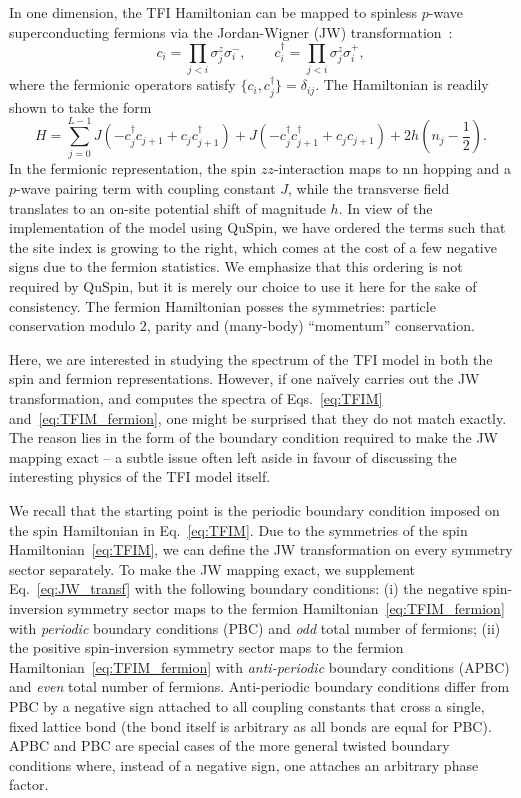 \documentclass{SciPost}
\newcommand\0{\scalebox{-1}[1]{0}}
\begin{document}
In one dimension, the TFI Hamiltonian can be mapped to spinless $p$-wave superconducting fermions via the Jordan-Wigner (JW) transformation~\cite{sachdev_book,dziarmaga_10,pfeuty_79}:
\begin{equation}
c_i=\prod_{j<i}\sigma^z_j\sigma^-_i,\qquad c^\dagger_i=\prod_{j<i}\sigma^z_j\sigma^+_i,
\label{eq:JW_transf}
\end{equation} 
where the fermionic operators satisfy $\{c_i,c^\dagger_j\}=\delta_{ij}$. The Hamiltonian is readily shown to take the form
\begin{equation}
H=\sum_{j=0}^{L-1}J\left(-c^\dagger_jc_{j+1} + c_jc^\dagger_{j+1} \right) +J\left( -c^\dagger_jc^\dagger_{j+1} + c_jc_{j+1}\right) + 2h\left(n_j-\frac{1}{2}\right).
\label{eq:TFIM_fermion}
\end{equation}
In the fermionic representation, the spin $zz$-interaction maps to nn hopping and a $p$-wave pairing term with coupling constant $J$, while the transverse field translates to an on-site potential shift of magnitude $h$. In view of the implementation of the model using QuSpin, we have ordered the terms such that the site index is growing to the right, which comes at the cost of a few negative signs due to the fermion statistics. We emphasize that this ordering is not required by QuSpin, but it is merely our choice to use it here for the sake of consistency. The fermion Hamiltonian posses the symmetries: particle conservation modulo $2$, parity and (many-body) ``momentum'' conservation.

Here, we are interested in studying the spectrum of the TFI model in both the spin and fermion representations. However, if one na\"ively carries out the JW transformation, and computes the spectra of Eqs.~\eqref{eq:TFIM} and~\eqref{eq:TFIM_fermion}, one might be surprised that they do not match exactly. The reason lies in the form of the boundary condition required to make the JW mapping exact -- a subtle issue often left aside in favour of discussing the interesting physics of the TFI model itself. 

We recall that the starting point is the periodic boundary condition imposed on the spin Hamiltonian in Eq.~\eqref{eq:TFIM}. Due to the symmetries of the spin Hamiltonian~\eqref{eq:TFIM}, we can define the JW transformation on every symmetry sector separately. To make the JW mapping exact, we supplement Eq.~\eqref{eq:JW_transf} with the following boundary conditions: (i) the negative spin-inversion symmetry sector maps to the fermion Hamiltonian~\eqref{eq:TFIM_fermion} with \emph{periodic} boundary conditions (PBC) and \emph{odd} total number of fermions; (ii) the positive spin-inversion symmetry sector maps to the fermion Hamiltonian~\eqref{eq:TFIM_fermion} with \emph{anti-periodic} boundary conditions (APBC) and \emph{even} total number of fermions. Anti-periodic boundary conditions differ from PBC by a negative sign attached to all coupling constants that cross a single, fixed lattice bond (the bond itself is arbitrary as all bonds are equal for PBC). APBC and PBC are special cases of the more general twisted boundary conditions where, instead of a negative sign, one attaches an arbitrary phase factor.
\end{document}
